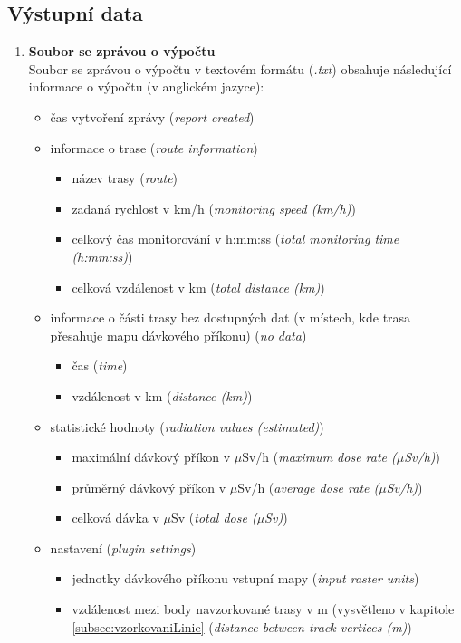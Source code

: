 \subsection{Výstupní data}
\label{sec:VystupniData}
\begin{enumerate}
	\item \textbf{Soubor se zprávou o výpočtu} \\
	Soubor se zprávou o výpočtu v textovém formátu (\textit{.txt}) obsahuje následující informace o výpočtu (v anglickém jazyce):
		\begin{itemize}
			\item čas vytvoření zprávy (\textit{report created})
			
			\item informace o trase (\textit{route information})
			\begin{itemize}
				\item název trasy (\textit{route})
				\item zadaná rychlost v km/h (\textit{monitoring speed (km/h)})
				\item celkový čas monitorování v h:mm:ss (\textit{total monitoring time (h:mm:ss)})
				\item celková vzdálenost v km (\textit{total distance (km)})
			\end{itemize}
			
			\item informace o části trasy bez dostupných dat (v místech, kde trasa přesahuje mapu dávkového příkonu) (\textit{no data})
			\begin{itemize}
				\item čas (\textit{time})
				\item vzdálenost v km (\textit{distance (km)})
			\end{itemize}
			
			\item statistické hodnoty (\textit{radiation values (estimated)})
			\begin{itemize}
				\item maximální dávkový příkon v $\mu$Sv/h (\textit{maximum dose rate ($\mu$Sv/h)})
				\item průměrný dávkový příkon v $\mu$Sv/h (\textit{average dose rate ($\mu$Sv/h)})
				\item celková dávka v $\mu$Sv (\textit{total dose ($\mu$Sv)})
			\end{itemize}
			
			\item nastavení (\textit{plugin settings})
			\begin{itemize}
				\item jednotky dávkového příkonu vstupní mapy (\textit{input raster units})
				\item vzdálenost mezi body navzorkované trasy v m (vysvětleno v kapitole \ref{subsec:vzorkovaniLinie} (\textit{distance between track vertices (m)})
			\end{itemize}
			

\end{itemize}
\end{enumerate}
